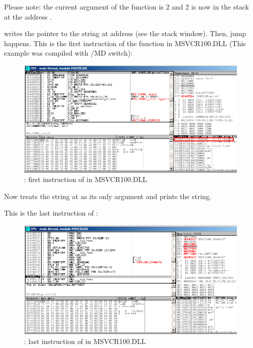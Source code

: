 Please note: the current argument of the function is 2 and 2 is now in the stack at the address .

\clearpage
\MOV writes the pointer to the string at address  (see the stack window).
Then, jump happens.
This is the first instruction of the \printf function in MSVCR100.DLL (This example was compiled with /MD switch): 

\begin{figure}[H]
\centering
\includegraphics[scale=\FigScale]{patterns/08_switch/1_few/olly6.png}
\caption{\olly: first instruction of \printf in MSVCR100.DLL}
\label{fig:switch_few_olly6}
\end{figure}

Now \printf treats the string at  as its only argument and prints the string.

\clearpage
This is the last instruction of \printf:

\begin{figure}[H]
\centering
\includegraphics[scale=\FigScale]{patterns/08_switch/1_few/olly7.png}
\caption{\olly: last instruction of \printf in MSVCR100.DLL}
\label{fig:switch_few_olly7}
\end{figure}

